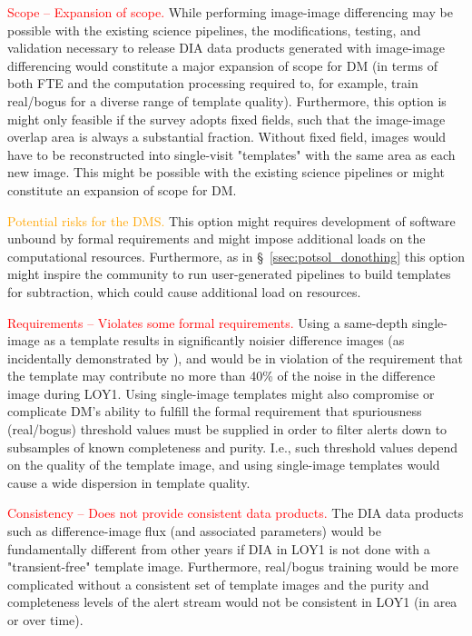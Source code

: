 \documentclass[DM,lsstdraft,toc]{lsstdoc}
\begin{document}
\textcolor{red}{ Scope -- Expansion of scope.}  While performing image-image differencing may be possible with the existing science pipelines, the modifications, testing, and validation necessary to release DIA data products generated with image-image differencing would constitute a major expansion of scope for DM (in terms of both FTE and the computation processing required to, for example, train real/bogus for a diverse range of template quality). Furthermore, this option is might only feasible if the survey adopts fixed fields, such that the image-image overlap area is always a substantial fraction. Without fixed field, images would have to be reconstructed into single-visit "templates" with the same area as each new image. This might be possible with the existing science pipelines or might constitute an expansion of scope for DM.

\textcolor{orange}{ Potential risks for the DMS.} This option might requires development of software unbound by formal requirements and might impose additional loads on the computational resources. Furthermore, as in \S~\ref{ssec:potsol_donothing} this option might inspire the community to run user-generated pipelines to build templates for subtraction, which could cause additional load on resources.

\textcolor{red}{ Requirements -- Violates some formal requirements.} Using a same-depth single-image as a template results in significantly noisier difference images (as incidentally demonstrated by ), and would be in violation of the requirement that the template may contribute no more than 40\% of the noise in the difference image during LOY1. Using single-image templates might also compromise or complicate DM's ability to fulfill the formal requirement that spuriousness (real/bogus) threshold values must be supplied in order to filter alerts down to subsamples of known completeness and purity. I.e., such threshold values depend on the quality of the template image, and using single-image templates would cause a wide dispersion in template quality.

\textcolor{red}{ Consistency -- Does not provide consistent data products.} The DIA data products such as difference-image flux (and associated parameters) would be fundamentally different from other years if DIA in LOY1 is not done with a "transient-free" template image. Furthermore, real/bogus training would be more complicated without a consistent set of template images and the purity and completeness levels of the alert stream would not be consistent in LOY1 (in area or over time).
\end{document}
